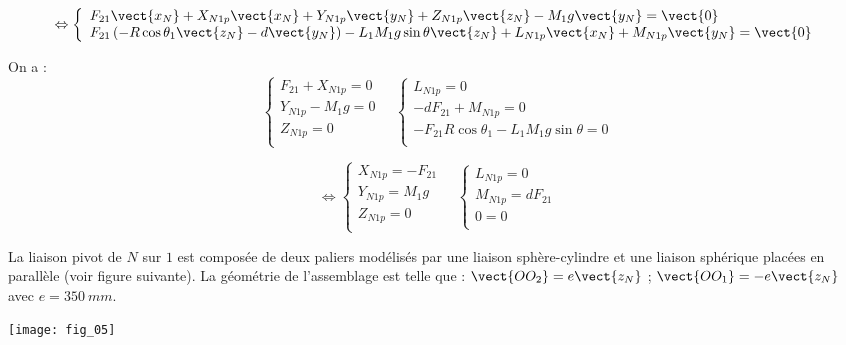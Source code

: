 \begin{multicols}{2}
\begin{corrige}
$$ \Leftrightarrow
\left\{
\begin{array}{l}
F_{21}\vect{x_N}+X_{N1p}\vect{x_N}+Y_{N1p}\vect{y_N}+Z_{N1p}\vect{z_N} - M_1g\vect{y_N} = \vect{0}\\
 F_{21}\left( - R\cos\theta_1\vect{z_N}- d\vect{y_N}\right)  
-L_1M_1g \sin \theta \vect{z_N} +L_{N1p}\vect{x_N}+M_{N1p}\vect{y_N} = \vect{0} \\
\end{array}
\right.
$$

On a : 
$$
\left\{
\begin{array}{l}
F_{21}+X_{N1p} = 0 \\
Y_{N1p}- M_1g = 0 \\
Z_{N1p}=0 \\
\end{array}
\right.
\quad
\left\{
\begin{array}{l}
 L_{N1p} = {0} \\
- dF_{21}+M_{N1p} = {0} \\
-F_{21}  R\cos\theta_1-L_1M_1g \sin \theta  = {0} \\
\end{array}
\right.
$$

$$
\Leftrightarrow
\left\{
\begin{array}{l}
X_{N1p} = - F_{21}\\
Y_{N1p}= M_1g  \\
Z_{N1p}=0 \\
\end{array}
\right.
\quad
\left\{
\begin{array}{l}
 L_{N1p} = {0} \\
M_{N1p} =dF_{21} \\
0 = 0\\
\end{array}
\right.
$$



\end{corrige}
\else
\fi

\ifprof
\else

La liaison pivot de $N$ sur $1$ est composée de deux paliers modélisés par une liaison sphère-cylindre et une liaison sphérique placées en parallèle (voir figure suivante). La
géométrie de l’assemblage est telle que :
$\vect{OO_2}= e\vect{z_N}$ ; $\vect{OO_1}= -e\vect{z_N}$ avec $e=\SI{350}{mm}$.




\begin{center}
\texttt{[image: fig\_05]}
\end{center}
\fi


\end{multicols}
